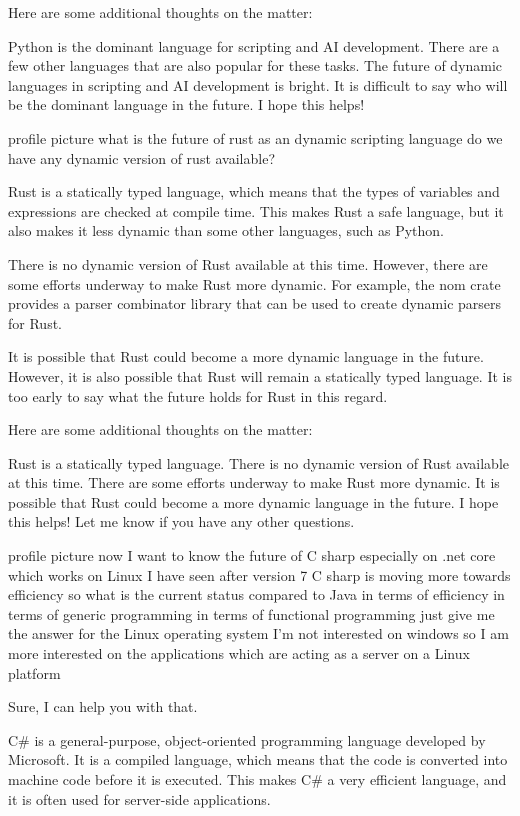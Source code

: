 \documentclass[11pt]{article}
\begin{document}
Here are some additional thoughts on the matter:

Python is the dominant language for scripting and AI development.
There are a few other languages that are also popular for these tasks.
The future of dynamic languages in scripting and AI development is bright.
It is difficult to say who will be the dominant language in the future.
I hope this helps!

profile picture
what is the future of
rust as an dynamic scripting language do we have any dynamic version of rust available?

Rust is a statically typed language, which means that the types of variables and expressions are checked at compile time. This makes Rust a safe language, but it also makes it less dynamic than some other languages, such as Python.

There is no dynamic version of Rust available at this time. However, there are some efforts underway to make Rust more dynamic. For example, the nom crate provides a parser combinator library that can be used to create dynamic parsers for Rust.

It is possible that Rust could become a more dynamic language in the future. However, it is also possible that Rust will remain a statically typed language. It is too early to say what the future holds for Rust in this regard.

Here are some additional thoughts on the matter:

Rust is a statically typed language.
There is no dynamic version of Rust available at this time.
There are some efforts underway to make Rust more dynamic.
It is possible that Rust could become a more dynamic language in the future.
I hope this helps! Let me know if you have any other questions.

profile picture
now I want to know the future of C sharp
especially on
.net core
which works on Linux
I have seen after version 7
C sharp is moving more towards efficiency
so what is the current status compared to Java
in terms of
efficiency
in terms of generic programming
in terms of functional programming
just give me the answer for the Linux operating system
I'm not interested on windows so I am more interested on the
applications which are
acting as a server
on a Linux
platform

Sure, I can help you with that.

C\# is a general-purpose, object-oriented programming language developed by Microsoft. It is a compiled language, which means that the code is converted into machine code before it is executed. This makes C\# a very efficient language, and it is often used for server-side applications.
\end{document}
